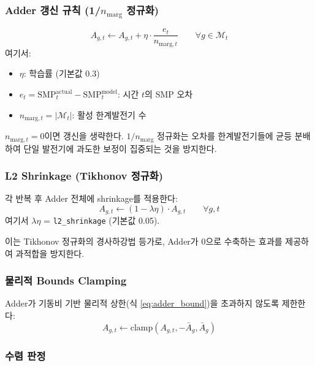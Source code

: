 \documentclass[11pt, a4paper]{article}
\begin{document}
\subsubsection{Adder 갱신 규칙 (1/$n_{\text{marg}}$ 정규화)}

\begin{equation}\label{eq:adder_update}
    \boxed{A_{g,t} \leftarrow A_{g,t} + \eta \cdot \frac{e_t}{n_{\text{marg},t}} \qquad \forall g \in \mathcal{M}_t}
\end{equation}
여기서:
\begin{itemize}[noitemsep]
    \item $\eta$: 학습률 (기본값 0.3)
    \item $e_t = \text{SMP}_t^{\text{actual}} - \text{SMP}_t^{\text{model}}$: 시간 $t$의 SMP 오차
    \item $n_{\text{marg},t} = |\mathcal{M}_t|$: 활성 한계발전기 수
\end{itemize}

$n_{\text{marg},t} = 0$이면 갱신을 생략한다.
$1/n_{\text{marg}}$ 정규화는 오차를 한계발전기들에 균등 분배하여
단일 발전기에 과도한 보정이 집중되는 것을 방지한다.

\subsubsection{L2 Shrinkage (Tikhonov 정규화)}

각 반복 후 Adder 전체에 shrinkage를 적용한다:
\begin{equation}\label{eq:l2_shrinkage}
    \boxed{A_{g,t} \leftarrow (1 - \lambda\eta) \cdot A_{g,t} \qquad \forall g, t}
\end{equation}
여기서 $\lambda\eta$ = \texttt{l2\_shrinkage} (기본값 0.05).

이는 Tikhonov 정규화의 경사하강법 등가로,
Adder가 0으로 수축하는 효과를 제공하여 과적합을 방지한다.

\subsubsection{물리적 Bounds Clamping}

Adder가 기동비 기반 물리적 상한(식 \eqref{eq:adder_bound})을 초과하지 않도록 제한한다:
\begin{equation}\label{eq:clamp}
    A_{g,t} \leftarrow \text{clamp}(A_{g,t}, -\bar{A}_g, \bar{A}_g)
\end{equation}

\subsubsection{수렴 판정}
\end{document}
